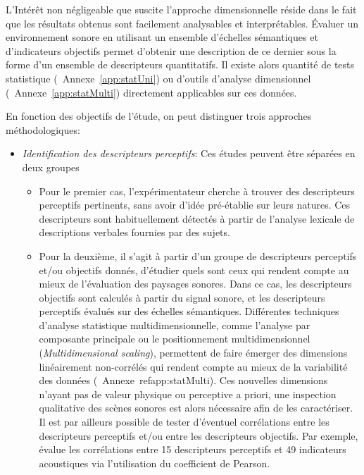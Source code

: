 L’Intérêt non négligeable que suscite l'approche dimensionnelle réside dans le fait que les résultats obtenus sont facilement analysables et interprétables. Évaluer un environnement sonore en utilisant un ensemble d'échelles sémantiques et d’indicateurs objectifs permet d'obtenir une description de ce dernier sous la forme d'un ensemble de descripteurs quantitatifs.  Il existe alors quantité de tests statistique (\Cf~Annexe~\ref{app:statUni}) ou d'outils d'analyse dimensionnel (\Cf~Annexe~\ref{app:statMulti}) directement applicables sur ces données.

En fonction des objectifs de l'étude, on peut distinguer trois approches méthodologiques:

\begin{itemize}

\item \emph{Identification des descripteurs perceptifs}: Ces études peuvent être séparées en deux groupes

\begin{itemize}
\item Pour le premier cas, l'expérimentateur cherche à trouver des descripteurs perceptifs pertinents, sans avoir d'idée pré-établie sur leurs natures. Ces descripteurs sont habituellement détectés à partir  de l'analyse lexicale de descriptions verbales fournies par des sujets.
\item Pour la deuxième, il s'agit à partir d'un groupe de descripteurs perceptifs et/ou objectifs donnés, d'étudier quels sont ceux qui rendent compte au mieux de l'évaluation des paysages sonores. Dans ce cas, les descripteurs objectifs sont calculés à partir du signal sonore, et les descripteurs perceptifs évalués sur des échelles sémantiques. Différentes techniques d'analyse statistique multidimensionnelle, comme l'analyse par composante principale ou le positionnement multidimensionnel (\emph{Multidimensional scaling}), permettent de faire émerger des dimensions linéairement non-corrélés qui rendent compte au mieux de la variabilité des données \citep{cain2013development,torija2013application} (\Cf~Annexe~ref{app:statMulti}). Ces nouvelles dimensions n'ayant pas de valeur physique ou perceptive a priori, une inspection qualitative des scènes sonores est alors nécessaire afin de les caractériser. Il est par ailleurs possible de tester d'éventuel corrélations entre les descripteurs perceptifs et/ou entre les descripteurs objectifs. Par exemple, \citep{torija2013application} évalue les corrélations entre 15 descripteurs perceptifs et 49 indicateurs acoustiques via l'utilisation du coefficient de Pearson.
\end{itemize}


\end{itemize}

